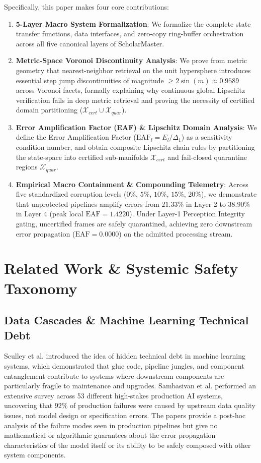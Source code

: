 \documentclass[conference]{IEEEtran}
\begin{document}
Specifically, this paper makes four core contributions:
\begin{enumerate}
    \item \textbf{5-Layer Macro System Formalization}: We formalize the complete state transfer functions, data interfaces, and zero-copy ring-buffer orchestration across all five canonical layers of ScholarMaster.
    \item \textbf{Metric-Space Voronoi Discontinuity Analysis}: We prove from metric geometry that nearest-neighbor retrieval on the unit hypersphere introduces essential step jump discontinuities of magnitude $\ge 2\sin(m) \approx 0.9589$ across Voronoi facets, formally explaining why continuous global Lipschitz verification fails in deep metric retrieval and proving the necessity of certified domain partitioning ($\mathcal{X}_{cert} \cup \mathcal{X}_{quar}$).
    \item \textbf{Error Amplification Factor (EAF) \& Lipschitz Domain Analysis}: We define the Error Amplification Factor ($\text{EAF}_l = E_l / \Delta_1$) as a sensitivity condition number, and obtain composite Lipschitz chain rules by partitioning the state-space into certified sub-manifolds $\mathcal{X}_{cert}$ and fail-closed quarantine regions $\mathcal{X}_{quar}$.
    \item \textbf{Empirical Macro Containment \& Compounding Telemetry}: Across five standardized corruption levels ($0\%$, $5\%$, $10\%$, $15\%$, $20\%$), we demonstrate that unprotected pipelines amplify errors from $21.33\%$ in Layer 2 to $38.90\%$ in Layer 4 (peak local $\text{EAF} = 1.4220$). Under Layer-1 Perception Integrity gating, uncertified frames are safely quarantined, achieving zero downstream error propagation ($\text{EAF} = 0.0000$) on the admitted processing stream.
\end{enumerate}

\section{Related Work \& Systemic Safety Taxonomy}
\subsection{Data Cascades \& Machine Learning Technical Debt}
Sculley et al. \cite{sculley2015hidden} introduced the idea of hidden technical debt in machine learning systems, which demonstrated that glue code, pipeline jungles, and component entanglement contribute to systems where downstream components are particularly fragile to maintenance and upgrades. Sambasivan et al. \cite{sambasivan2021everyone} performed an extensive survey across 53 different high-stakes production AI systems, uncovering that $92\%$ of production failures were caused by upstream data quality issues, not model design or specification errors. The papers provide a post-hoc analysis of the failure modes seen in production pipelines but give no mathematical or algorithmic guarantees about the error propagation characteristics of the model itself or its ability to be safely composed with other system components.
\end{document}
